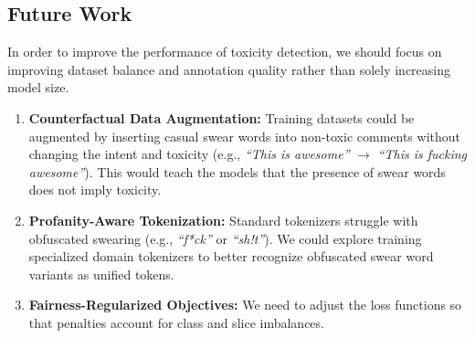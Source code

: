 \documentclass[11pt]{article}
\begin{document}
\subsection{Future Work}

In order to improve the performance of toxicity detection, we should
focus on improving dataset balance and annotation quality rather
than solely increasing model size.

\begin{enumerate}\setlength{\itemsep}{1pt}\setlength{\parskip}{0pt}
  \item \textbf{Counterfactual Data Augmentation:} Training datasets
    could be augmented by inserting casual swear words into non-toxic
    comments without changing the intent and toxicity (e.g.,
      \textit{``This is awesome''} $\to$ \textit{``This is fucking
    awesome''}). This would teach the models that the presence of swear
    words does not imply toxicity.

  \item \textbf{Profanity-Aware Tokenization:} Standard tokenizers
    struggle with obfuscated swearing (e.g., \textit{``f*ck''} or
    \textit{``sh!t''}). We could explore training specialized domain
    tokenizers to better recognize obfuscated swear word variants as
    unified tokens.

  \item \textbf{Fairness-Regularized Objectives:} We need to adjust
    the loss functions so that penalties account for class
    and slice imbalances.
\end{enumerate}


\end{document}
